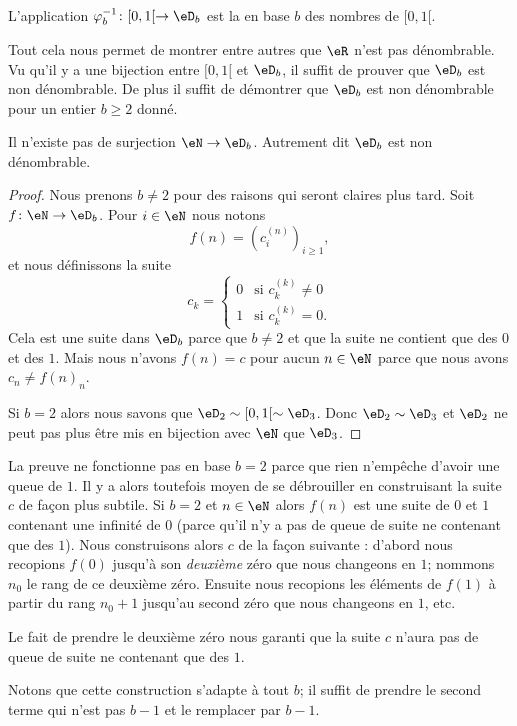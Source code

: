 L'application \( \varphi_b^{-1}\colon \mathopen[ 0 , 1 [\to \eD_b\) est la  en base \( b\) des nombres de \( \mathopen[ 0 , 1 [\).

Tout cela nous permet de montrer entre autres que \( \eR\) n'est pas dénombrable. Vu qu'il y a une bijection entre \( \mathopen[ 0 , 1 [\) et \( \eD_b\), il suffit de prouver que \( \eD_b\) est non dénombrable. De plus il suffit de démontrer que \( \eD_b\) est non dénombrable pour un entier \( b\geq 2\) donné.

\begin{proposition}  \label{PropNNHooYTVFw}
    Il n'existe pas de surjection \( \eN\to \eD_b\). Autrement dit \( \eD_b\) est non dénombrable.
\end{proposition}

\begin{proof}
    Nous prenons \( b\neq 2\) pour des raisons qui seront claires plus tard. Soit \( f\colon \eN\to \eD_b\). Pour \( i\in \eN\) nous notons
    \begin{equation}
        f(n)=(c_i^{(n)})_{i\geq 1},
    \end{equation}
    et nous définissons la suite
    \begin{equation}
        c_k=\begin{cases}
            0    &   \text{si } c_k^{(k)}\neq 0\\
            1    &    \text{si } c_k^{(k)}=0.
        \end{cases}
    \end{equation}
    Cela est une suite dans \( \eD_b\) parce que \( b\neq 2\) et que la suite ne contient que des \( 0\) et des \( 1\). Mais nous n'avons \( f(n)=c\) pour aucun \( n\in \eN\) parce que nous avons \( c_n\neq f(n)_n\).

    Si \( b=2\) alors nous savons que \( \eD_2\sim\mathopen[ 0 , 1 [\sim \eD_3\). Donc \( \eD_2\sim \eD_3\) et \( \eD_2\) ne peut pas plus être mis en bijection avec \( \eN\) que \( \eD_3\).
\end{proof}
\begin{remark}
    La preuve ne fonctionne pas en base \( b=2\) parce que rien n'empêche d'avoir une queue de \( 1\). Il y a alors toutefois moyen de se débrouiller en construisant la suite \( c\) de façon plus subtile. Si \( b=2\) et \( n\in \eN\) alors \( f(n)\) est une suite de \( 0\) et \( 1\) contenant une infinité de \( 0\) (parce qu'il n'y a pas de queue de suite ne contenant que des \( 1\)). Nous construisons alors \( c\) de la façon suivante : d'abord nous recopions \( f(0)\) jusqu'à son \emph{deuxième} zéro que nous changeons en \( 1\); nommons \( n_0\) le rang de ce deuxième zéro. Ensuite nous recopions les éléments de \( f(1) \) à partir du rang \( n_0+1\) jusqu'au second zéro que nous changeons en \( 1\), etc.

    Le fait de prendre le deuxième zéro nous garanti que la suite \( c\) n'aura pas de queue de suite ne contenant que des \( 1\).

    Notons que cette construction s'adapte à tout \( b\); il suffit de prendre le second terme qui n'est pas \( b-1\) et le remplacer par \( b-1\).
\end{remark}

